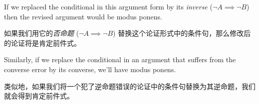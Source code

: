 If we replaced the conditional in this argument form by its {\em inverse} 
(${\lnot}A \implies {\lnot}B$) then the revised argument would be 
modus ponens.

如果我们用它的{\em 否命题} (${\lnot}A \implies {\lnot}B$) 替换这个论证形式中的条件句，那么修改后的论证将是肯定前件式。

Similarly, if we replace the conditional in an
argument that suffers from the converse error by its converse, 
we'll have modus ponens.

类似地，如果我们将一个犯了逆命题错误的论证中的条件句替换为其逆命题，我们就会得到肯定前件式。
\clearpage




%
%



